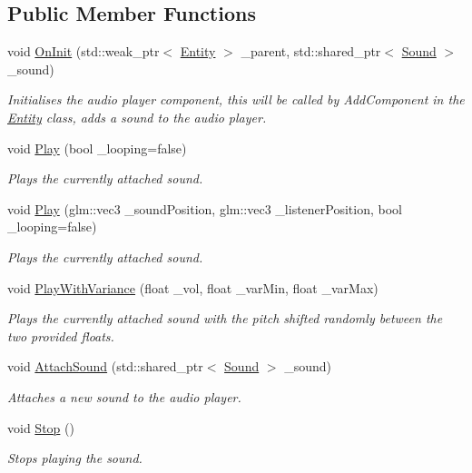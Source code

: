 \subsection*{Public Member Functions}
\begin{DoxyCompactItemize}
\item 
void \hyperlink{classfrontier_1_1_audio_player_a6a000a15e398c4de2eb767c4a4cbede7}{On\+Init} (std\+::weak\+\_\+ptr$<$ \hyperlink{classfrontier_1_1_entity}{Entity} $>$ \+\_\+parent, std\+::shared\+\_\+ptr$<$ \hyperlink{classfrontier_1_1_sound}{Sound} $>$ \+\_\+sound)
\begin{DoxyCompactList}\small\item\em Initialises the audio player component, this will be called by Add\+Component in the \hyperlink{classfrontier_1_1_entity}{Entity} class, adds a sound to the audio player. \end{DoxyCompactList}\item 
void \hyperlink{classfrontier_1_1_audio_player_ad5791ca0776113116a815f86bd630ad7}{Play} (bool \+\_\+looping=false)
\begin{DoxyCompactList}\small\item\em Plays the currently attached sound. \end{DoxyCompactList}\item 
void \hyperlink{classfrontier_1_1_audio_player_a757be1bd81df8c3885b03177946b38d1}{Play} (glm\+::vec3 \+\_\+sound\+Position, glm\+::vec3 \+\_\+listener\+Position, bool \+\_\+looping=false)
\begin{DoxyCompactList}\small\item\em Plays the currently attached sound. \end{DoxyCompactList}\item 
void \hyperlink{classfrontier_1_1_audio_player_ad26964a251fa785cacd76617efa92ee3}{Play\+With\+Variance} (float \+\_\+vol, float \+\_\+var\+Min, float \+\_\+var\+Max)
\begin{DoxyCompactList}\small\item\em Plays the currently attached sound with the pitch shifted randomly between the two provided floats. \end{DoxyCompactList}\item 
void \hyperlink{classfrontier_1_1_audio_player_abb7536bee69926c8643a9c3ab6eb714f}{Attach\+Sound} (std\+::shared\+\_\+ptr$<$ \hyperlink{classfrontier_1_1_sound}{Sound} $>$ \+\_\+sound)
\begin{DoxyCompactList}\small\item\em Attaches a new sound to the audio player. \end{DoxyCompactList}\item 
void \hyperlink{classfrontier_1_1_audio_player_a0e22a78d69571eac70811c8457eeda50}{Stop} ()
\begin{DoxyCompactList}\small\item\em Stops playing the sound. \end{DoxyCompactList}\end{DoxyCompactItemize}

